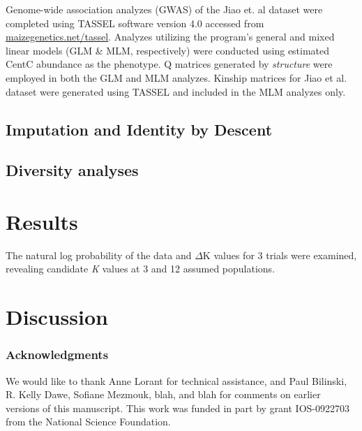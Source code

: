 \documentclass[12pt]{article}
\begin{document}
Genome-wide association analyzes (GWAS) of the Jiao et. al dataset were completed using TASSEL software version 4.0 accessed from \url{maizegenetics.net/tassel}.  Analyzes utilizing the program's general and mixed linear models (GLM \& MLM, respectively) were conducted using estimated CentC abundance as the phenotype.  Q matrices generated by \emph{structure} were employed in both the GLM and MLM analyzes.  Kinship matrices for Jiao et al. dataset were generated using TASSEL and included in the MLM analyzes only.    
\subsection{Imputation and Identity by Descent} %


\subsection{Diversity analyses} %


\section{Results}

The natural log probability of the data and  $\Delta$K values for 3 trials were examined, revealing candidate \emph{K} values at 3 and 12 assumed populations.    

\section{Discussion}

\subsubsection*{Acknowledgments}
We would like to thank Anne Lorant for technical assistance, and Paul Bilinski, R. Kelly Dawe, Sofiane Mezmouk, blah, and blah for comments on earlier versions of this manuscript.  This work was funded in part by grant IOS-0922703 from the National Science Foundation.

\clearpage

\end{document}
